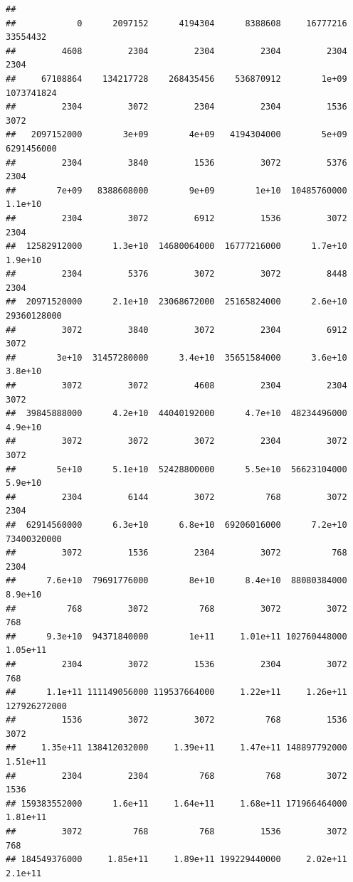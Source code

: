 \documentclass[
]{article}
\begin{document}
\begin{verbatim}
## 
##            0      2097152      4194304      8388608     16777216     33554432 
##         4608         2304         2304         2304         2304         2304 
##     67108864    134217728    268435456    536870912        1e+09   1073741824 
##         2304         3072         2304         2304         1536         3072 
##   2097152000        3e+09        4e+09   4194304000        5e+09   6291456000 
##         2304         3840         1536         3072         5376         2304 
##        7e+09   8388608000        9e+09        1e+10  10485760000      1.1e+10 
##         2304         3072         6912         1536         3072         2304 
##  12582912000      1.3e+10  14680064000  16777216000      1.7e+10      1.9e+10 
##         2304         5376         3072         3072         8448         2304 
##  20971520000      2.1e+10  23068672000  25165824000      2.6e+10  29360128000 
##         3072         3840         3072         2304         6912         3072 
##        3e+10  31457280000      3.4e+10  35651584000      3.6e+10      3.8e+10 
##         3072         3072         4608         2304         2304         3072 
##  39845888000      4.2e+10  44040192000      4.7e+10  48234496000      4.9e+10 
##         3072         3072         3072         2304         3072         3072 
##        5e+10      5.1e+10  52428800000      5.5e+10  56623104000      5.9e+10 
##         2304         6144         3072          768         3072         2304 
##  62914560000      6.3e+10      6.8e+10  69206016000      7.2e+10  73400320000 
##         3072         1536         2304         3072          768         2304 
##      7.6e+10  79691776000        8e+10      8.4e+10  88080384000      8.9e+10 
##          768         3072          768         3072         3072          768 
##      9.3e+10  94371840000        1e+11     1.01e+11 102760448000     1.05e+11 
##         2304         3072         1536         2304         3072          768 
##      1.1e+11 111149056000 119537664000     1.22e+11     1.26e+11 127926272000 
##         1536         3072         3072          768         1536         3072 
##     1.35e+11 138412032000     1.39e+11     1.47e+11 148897792000     1.51e+11 
##         2304         2304          768          768         3072         1536 
## 159383552000      1.6e+11     1.64e+11     1.68e+11 171966464000     1.81e+11 
##         3072          768          768         1536         3072          768 
## 184549376000     1.85e+11     1.89e+11 199229440000     2.02e+11      2.1e+11 

\end{verbatim}
\end{document}

